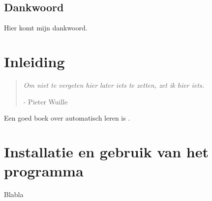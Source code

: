 \documentclass[dutch,12pt,oneside,a4paper]{book}
\newcommand{\phantomsection}{}
\newcommand{\includebitmap}[1]{\texttt{[image: \#1]}}
\newcommand{\includebitmap}[1]{\texttt{[image: \#1.png]}}
\begin{document}


\cleardoublepage
\section*{Dankwoord}

Hier komt mijn dankwoord.

\newpage
\tableofcontents

\newpage
\mainmatter
\chapter{Inleiding}
\label{inleiding:chap}
\begin{quote}
{{\small\it Om niet te vergeten hier later iets te zetten, zet ik hier iets.}}

{{\small\sc - Pieter Wuille}}
\end{quote}
\medskip

Een goed boek over automatisch leren is \cite{mitchell:book}.



%



\cleardoublepage{}\phantomsection{}
\appendix
\chapter{Installatie en gebruik van het programma}

Blabla

\backmatter
{}



\listoffigures
{}
\listoftables
\end{document}
